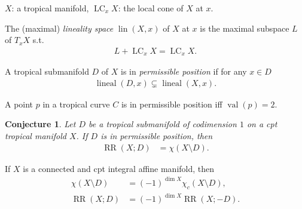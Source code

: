 \documentclass[dvipdfmx,12pt]{beamer}%
\newtheorem{conjecture}[theorem]{Conjecture}
\theoremstyle{definition}
\newcommand{\opn}[1]{\operatorname{#1}}
\begin{document}
\begin{frame}

$X$: a tropical manifold,
$\opn{LC}_x X$: the local cone of $X$ at $x$.

\begin{definition}

The (maximal) \emph{lineality space} 
$\opn{lin}(X,x)$ of $X$ at $x$ is
the maximal subspace $L$ of $T_x X$ s.t.
\begin{align}
L+\opn{LC}_x X =\opn{LC}_x X.
\end{align}

\end{definition}



\begin{definition}
A tropical submanifold $D$ of $X$ is in 
\emph{permissible position} if for any $x\in D$
\begin{align}
\opn{lineal}(D,x) \subsetneq
 \opn{lineal}(X,x).
\end{align}

\end{definition}




\end{frame}


\begin{frame}
\begin{example}
A point $p$ in a tropical curve $C$ is in permissible 
position iff $\opn{val}(p)=2$.
\end{example}
\end{frame}

\begin{frame}
\begin{conjecture}
Let $D$ be a tropical submanifold of codimension $1$ on
a cpt tropical manifold $X$. 
If $D$ is in permissible position, then 
\begin{align}
\opn{RR}(X;D)&=\chi(X\setminus D).
\end{align}
\end{conjecture}

\begin{example}
If $X$ is a connected and cpt integral affine manifold,
then
\begin{align}
\chi (X\setminus D)&=(-1)^{\dim X}\chi_c(X\setminus D), \\
\opn{RR}(X;D)&=(-1)^{\dim X}\opn{RR}(X;-D).
\end{align}

\end{example}

\end{frame}

\begin{frame}
	
\end{frame}
\end{document}
